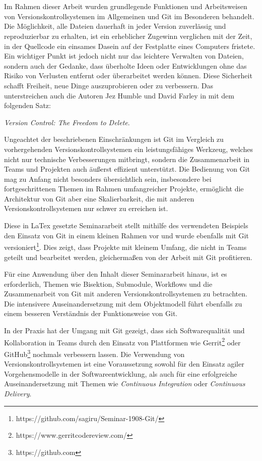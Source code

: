 \chapter{\result}\label{cha:result}
Im Rahmen dieser Arbeit wurden grundlegende Funktionen und Arbeitsweisen von
Versionskontrollsystemen im Allgemeinen und Git im Besonderen behandelt.
Die Möglichkeit, alle Dateien dauerhaft in jeder Version zuverlässig und
reproduzierbar zu erhalten, ist ein erheblicher Zugewinn verglichen mit der
Zeit, in der Quellcode ein einsames Dasein auf der Festplatte eines Computers
fristete. Ein wichtiger Punkt ist jedoch nicht nur das leichtere
Verwalten von Dateien, sondern auch der Gedanke, dass überholte Ideen oder
Entwicklungen ohne das Risiko von Verlusten entfernt oder überarbeitet werden
können. Diese Sicherheit schafft Freiheit, neue Dinge auszuprobieren
oder zu verbessern. Das unterstreichen auch die Autoren Jez Humble und David
Farley in \cite[S.~35]{cd} mit dem folgenden Satz:

\begin{center}
\textit{\glqq{}Version Control: The Freedom to Delete}\grqq{}.
\end{center}

Ungeachtet der beschriebenen Einschränkungen ist Git im Vergleich zu
vorhergehenden Versionskontrollsystemen ein leistungsfähiges Werkzeug, welches
nicht nur technische Verbesserungen mitbringt, sondern die Zusammenarbeit in
Teams und Projekten auch äußerst effizient unterstützt. Die Bedienung von
Git mag zu Anfang nicht besonders übersichtlich sein, insbesondere bei
fortgeschrittenen Themen im Rahmen umfangreicher Projekte, ermöglicht die
Architektur von Git aber eine Skalierbarkeit, die mit anderen
Versionskontrollsystemen nur schwer zu erreichen ist.

Diese in LaTex gesetzte Seminararbeit stellt mithilfe des verwendeten Beispiels
den Einsatz von Git in einem kleinen Rahmen vor und wurde ebenfalls mit Git
versioniert\footnote{https://github.com/sagiru/Seminar-1908-Git/}. Dies zeigt,
dass Projekte mit kleinem Umfang, die nicht in Teams geteilt und bearbeitet
werden, gleichermaßen von der Arbeit mit Git profitieren.

Für eine Anwendung über den Inhalt dieser Seminararbeit hinaus, ist es
erforderlich, Themen wie Bisektion, Submodule, Workflows und die Zusammenarbeit
von Git mit anderen Versionskontrollsystemen zu betrachten. Die intensivere
Auseinandersetzung mit dem Objektmodell führt ebenfalls zu einem besseren
Verständnis der Funktionsweise von Git.

In der Praxis hat der Umgang mit Git gezeigt, dass sich Softwarequalität und
Kollaboration in Teams durch den Einsatz von Plattformen wie
Gerrit\footnote{https://www.gerritcodereview.com/} oder
GitHub\footnote{https://github.com} nochmals verbessern lassen. Die Verwendung
von Versionskontrollsystemen ist eine Voraussetzung sowohl für den Einsatz
agiler Vorgehensmodelle in der Softwareentwicklung, als auch für eine
erfolgreiche Auseinandersetzung mit Themen wie \textit{Continuous Integration}
oder \textit{Continuous Delivery}.
